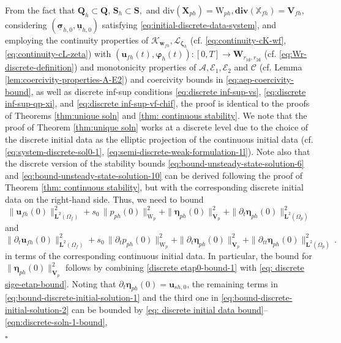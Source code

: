 \documentclass[11pt]{article}
\numberwithin{equation}{section}
\newcommand{\bbeta}{{\boldsymbol\eta}}
\newcommand{\bsi}{{\boldsymbol\sigma}}
\newcommand{\bvarphi}{{\boldsymbol\varphi}}
\newcommand{\bzeta}{{\boldsymbol\zeta}}
\newcommand{\ubsi}{\underline{\bsi}}
\newcommand{\ubu}{\underline{\bu}}
\newcommand{\bw}{{\mathbf{w}}}
\newcommand{\bu}{\mathbf{u}}
\newcommand{\0}{{\mathbf{0}}}
\def\bX{\mathbf{X}}
\def\bV{\mathbf{V}}
\def\bW{\mathbf{W}}
\def\bQ{\mathbf{Q}}
\def\bS{\mathbf{S}}
\newcommand{\bL}{\mathbf{L}}
\newcommand\bbX{\mathbb{X}}
\newcommand{\cA}{\mathcal{A}}
\newcommand{\cC}{\mathcal{C}}
\newcommand{\cE}{\mathcal{E}}
\newcommand{\cK}{\mathcal{K}}
\newcommand{\cL}{\mathcal{L}}
\def\W{\mathrm{W}}
\def\ttd{\mathtt{d}}
\def\bdiv{\mathbf{div}}
\def\div{\mathrm{div}}
\newenvironment{proof}{\noindent{\it Proof.}}{\hfill$\square$}
\numberwithin{equation}{section}
\begin{document}
\begin{proof}
From the fact that $\bQ_h \subset \bQ$, $\bS_h \subset \bS,$ and $\div(\bX_{ph})=\W_{ph}, 
\bdiv(\bbX_{fh}) = \bV_{fh}$, considering $(\ubsi_{h,0},\ubu_{h,0})$ satisfying \eqref{eq:initial-discrete-data-system}, and employing the continuity properties of $\cK_{\bw_{fh}}, \cL_{\bzeta_{h}}$ (cf. \eqref{eq:continuity-cK-wf}, \eqref{eq:continuity-cL-zeta}) with $(\bu_{fh}(t),\bvarphi_{h}(t)):[0,T]\to \bW_{r_{1\ttd},r_{2\ttd}}$ (cf. \eqref{eq:Wr-discrete-definition}) and monotonicity properties of  $\cA, \cE_1, \cE_2$ and $\cC$ (cf. Lemma \ref{lem:coercivity-properties-A-E2}) and coercivity bounds in \eqref{eq:aep-coercivity-bound}, as well as discrete inf-sup conditions \eqref{eq:discrete inf-sup-vs}, \eqref{eq:discrete inf-sup-qp-xi}, and \eqref{eq:discrete inf-sup-vf-chif}, the proof is identical to the proofs of Theorems \ref{thm:unique soln} and \ref{thm: continuous stability}.
We note that the proof of Theorem \ref{thm:unique soln} works at a discrete level due to the choice of the discrete initial data as the elliptic projection of the continuous initial data (cf. \eqref{eq:system-discrete-sol0-1}, \eqref{eq:semi-discrete-weak-formulation-1l}).
Note also that the discrete version of the stability bounds \eqref{eq:bound-unsteady-state-solution-6} and \eqref{eq:bound-unsteady-state-solution-10} can be derived following the proof of Theorem \ref{thm: continuous stability}, but with the corresponding discrete initial data on the right-hand side. Thus, we need to bound
\begin{equation}\label{eq:bound-discrete-initial-solution-1}
\|\bu_{fh}(0)\|^2_{\bL^2(\Omega_f)} 
+ s_0\,\|p_{ph}(0)\|^2_{\W_p} 
+ \|\bbeta_{ph}(0)\|^2_{\bV_p} 
+ \| \partial_t\bbeta_{ph}(0)\|^2_{\bL^2(\Omega_p)}  
\end{equation}
and
\begin{equation}\label{eq:bound-discrete-initial-solution-2}
\| \partial_t\bu_{fh}(0)\|^2_{\bL^2(\Omega_f)} 
+ s_0\,\|\partial_t p_{ph}(0)\|^2_{\W_p} 
+ \|\partial_t\bbeta_{ph}(0)\|^2_{\bV_p}
+ \|\partial_{tt}\bbeta_{ph}(0)\|^2_{\bL^2(\Omega_p)} \,.
\end{equation}
in terms of the corresponding continuous initial data.
In particular, the bound for $\|\bbeta_{ph}(0)\|^2_{\bV_p}$ follows by combining \eqref{discrete etap0-bound-1} with \eqref{eq: discrete sige-etap-bound}.
Noting that $\partial_t\bbeta_{ph}(0) = \bu_{sh,0}$, the remaining terms in \eqref{eq:bound-discrete-initial-solution-1} and the third one in \eqref{eq:bound-discrete-initial-solution-2} can be bounded by \eqref{eq: discrete initial data bound}--\eqref{eqn:discrete-soln-1-bound},

\end{proof}
\end{document}
